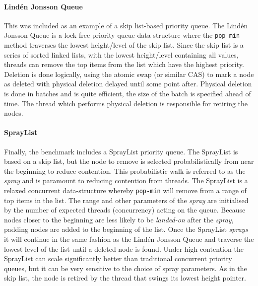 \paragraph{Lind{\'e}n Jonsson Queue} This was included as an example of a skip list-based priority queue. \cite{LindenPriority} The Lind{\'e}n Jonsson Queue is a lock-free priority queue data-structure where the \texttt{pop-min} method traverses the lowest height/level of the skip list. Since the skip list is a series of sorted linked lists, with the lowest height/level containing all values, threads can remove the top items from the list which have the highest priority. Deletion is done logically, using the atomic swap (or similar CAS) to mark a node as deleted with physical deletion delayed until some point after. Physical deletion is done in batches and is quite efficient, the size of the batch is specified ahead of time. The thread which performs physical deletion is responsible for retiring the nodes.

\paragraph{SprayList} Finally, the benchmark includes a SprayList priority queue.\cite{SprayList} The SprayList is based on a skip list, but the node to remove is selected probabilistically from near the beginning to reduce contention. This probabilistic walk is referred to as the \textit{spray} and is paramount to reducing contention from threads. The SprayList is a relaxed concurrent data-structure whereby \texttt{pop-min} will remove from a range of top items in the list. The range and other parameters of the \textit{spray} are initialised by the number of expected threads (concurrency) acting on the queue. Because nodes closer to the beginning are less likely to be \textit{landed-on} after the \textit{spray}, padding nodes are added to the beginning of the list. Once the SprayList \textit{sprays} it will continue in the same fashion as the Lind{\'e}n Jonsson Queue and traverse the lowest level of the list until a deleted node is found. Under high contention the SprayList can scale significantly better than traditional concurrent priority queues, but it can be very sensitive to the choice of spray parameters. As in the skip list, the node is retired by the thread that swings its lowest height pointer.
